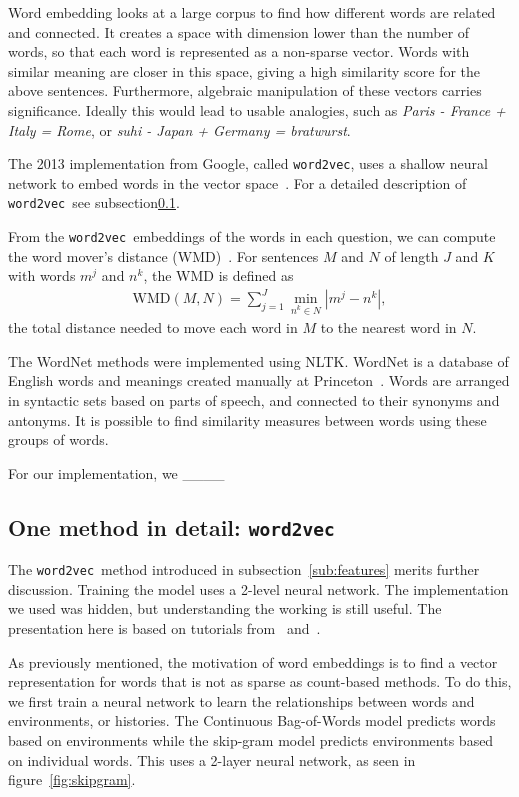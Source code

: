 \documentclass{article} %
\newcommand{\wordtvec}{\texttt{word2vec}}
\begin{document}
Word embedding looks at a large corpus to find how different words are related and connected. It creates a space with dimension lower than the number of words, so that each word is represented as a non-sparse vector. Words with similar meaning are closer in this space, giving a high similarity score for the above sentences. Furthermore, algebraic manipulation of these vectors carries significance. Ideally this would lead to usable analogies, such as \textit{Paris - France + Italy = Rome}, or \textit{suhi - Japan + Germany = bratwurst}.

The 2013 implementation from Google, called \wordtvec, uses a shallow neural network to embed words in the vector space~\cite{word2vec}. For a detailed description of \wordtvec\ see subsection\ref{sub:detail}.

From the \wordtvec\ embeddings of the words in each question, we can compute the word mover's distance (WMD)~\cite{kusner15}. For sentences $M$ and $N$ of length $J$ and $K$ with words $m^j$ and $n^k$, the WMD is defined as 
\begin{align}
\text{WMD}(M,N) = \sum_{j=1}^J\min_{n^k\in N}\left|m^j-n^k\right|,
\end{align}
the total distance needed to move each word in $M$ to the nearest word in $N$.

The WordNet methods were implemented using NLTK. WordNet is a database of English words and meanings created manually at Princeton~\cite{wordnet}. Words are arranged in syntactic sets based on parts of speech, and connected to their synonyms and antonyms. It is possible to find similarity measures between words using these groups of words. 

For our implementation, we \_\_\_\_

\subsection{One method in detail: \wordtvec} \label{sub:detail}

The \wordtvec\ method introduced in subsection~\ref{sub:features} merits further discussion. Training the model uses a 2-level neural network. The implementation we used was hidden, but understanding the working is still useful. The presentation here is based on tutorials from~\cite{tensorflow} and~\cite{mccormick}.

As previously mentioned, the motivation of word embeddings is to find a vector representation for words that is not as sparse as count-based methods. To do this, we first train a neural network to learn the relationships between words and environments, or histories. The Continuous Bag-of-Words model predicts words based on environments while the skip-gram model predicts environments based on individual words. This uses a 2-layer neural network, as seen in figure~\ref{fig:skipgram}. 
\end{document}
